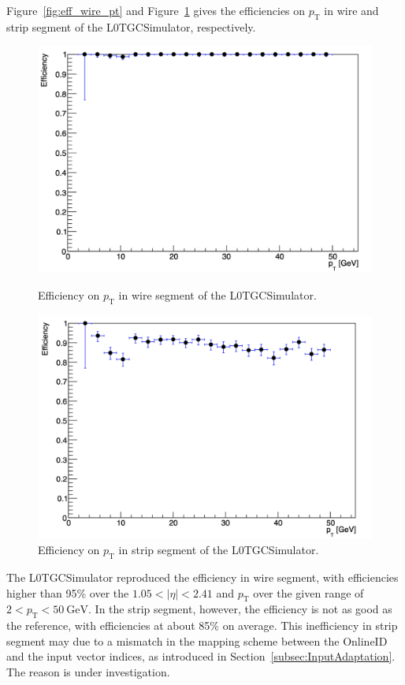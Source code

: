 Figure~\ref{fig:eff_wire_pt} and Figure~\ref{fig:eff_strip_pt} gives the efficiencies on $p_\mathrm{T}$ in wire and strip segment of the L0TGCSimulator, respectively. 

\begin{figure}[htbp]
  \begin{minipage}{0.50\textwidth}
    \centering
    \includegraphics[width=\linewidth]{figs/chapter5/eff_wire_pt.png}
    \caption{Efficiency on $p_\mathrm{T}$ in wire segment of the L0TGCSimulator.}
    \label{fig:eff_wire_pt}
  \end{minipage}
  \hfill
  \begin{minipage}{0.50\textwidth}
    \centering
    \includegraphics[width=\linewidth]{figs/chapter5/eff_strip_pt.png}
    \caption{Efficiency on $p_\mathrm{T}$ in strip segment of the L0TGCSimulator.}
    \label{fig:eff_strip_pt}
  \end{minipage}
\end{figure}

The L0TGCSimulator reproduced the efficiency in wire segment, with efficiencies higher than 95\% over the $1.05 < |\eta| < 2.41$ and $p_\mathrm{T}$ over the given range of $2 < p_\mathrm{T} < 50~\text{GeV}$. In the strip segment, however, the efficiency is not as good as the reference, with efficiencies at about 85\% on average. This inefficiency in strip segment may due to a mismatch in the mapping scheme between the OnlineID and the input vector indices, as introduced in Section~\ref{subsec:InputAdaptation}. The reason is under investigation.